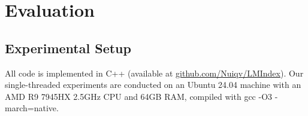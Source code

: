 

\section{Evaluation}
\label{sec:evaluation}


\subsection{Experimental Setup}
All code is implemented in C++ (available at \url{github.com/Nuiqv/LMIndex}). Our single-threaded experiments are conducted on an Ubuntu 24.04 machine with an AMD R9 7945HX 2.5GHz CPU and 64GB RAM, compiled with gcc -O3 -march=native.

